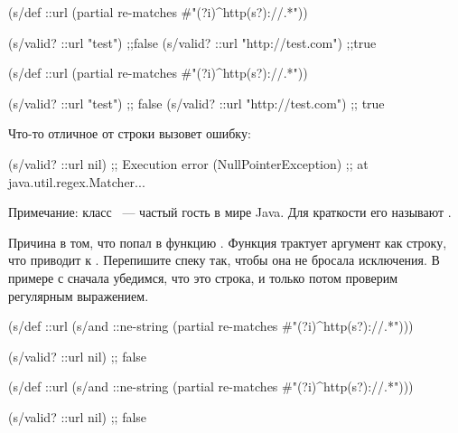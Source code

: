 \pagebreaklarge


\ifnarrow


\begin{clojure}
(s/def ::url
  (partial
    re-matches #"(?i)^http(s?)://.*"))

(s/valid? ::url "test") ;;false
(s/valid? ::url "http://test.com") ;;true
\end{clojure}


\else


\begin{clojure}
(s/def ::url
  (partial re-matches #"(?i)^http(s?)://.*"))

(s/valid? ::url "test")            ;; false
(s/valid? ::url "http://test.com") ;; true
\end{clojure}


\fi

Что-то отличное от строки вызовет ошибку:



\begin{clojure}
(s/valid? ::url nil)
;; Execution error (NullPointerException)
;; at java.util.regex.Matcher...
\end{clojure}



Примечание: класс ~--- частый гость в мире Java. Для
краткости его называют .

Причина в том, что  попал в функцию . Функция
трактует аргумент как строку, что приводит к . Перепишите спеку так,
чтобы она не бросала исключения. В примере с  сначала убедимся,
что это строка, и только потом проверим регулярным выражением.

\ifnarrow


\begin{clojure}
(s/def ::url
  (s/and ::ne-string
         (partial re-matches
           #"(?i)^http(s?)://.*")))

(s/valid? ::url nil) ;; false
\end{clojure}


\else


\begin{clojure}
(s/def ::url
  (s/and ::ne-string
         (partial re-matches #"(?i)^http(s?)://.*")))

(s/valid? ::url nil) ;; false
\end{clojure}


